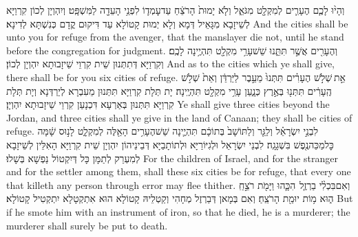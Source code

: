 {וְהָי֨וּ לָכֶ֧ם הֶעָרִ֛ים לְמִקְלָ֖ט מִגֹּאֵ֑ל וְלֹ֤א יָמוּת֙ הָרֹצֵ֔חַ עַד\maqqaf עׇמְד֛וֹ לִפְנֵ֥י הָעֵדָ֖ה לַמִּשְׁפָּֽט׃}
{וְיִהְוְיָן לְכוֹן קִרְוַיָּא לְשֵׁיזָבָא מִגָּאֵיל דְּמָא וְלָא יְמוּת קָטוֹלָא עַד דִּיקוּם קֳדָם כְּנִשְׁתָּא לְדִינָא׃}
{And the cities shall be unto you for refuge from the avenger, that the manslayer die not, until he stand before the congregation for judgment.}{}
{וְהֶעָרִ֖ים אֲשֶׁ֣ר תִּתֵּ֑נוּ שֵׁשׁ\maqqaf עָרֵ֥י מִקְלָ֖ט תִּהְיֶ֥ינָה לָכֶֽם׃}
{וְקִרְוַיָּא דְּתִתְּנוּן שֵׁית קִרְוֵי שֵׁיזָבוּתָא יִהְוְיָן לְכוֹן׃}
{And as to the cities which ye shall give, there shall be for you six cities of refuge.}{}
{אֵ֣ת \legarmeh  שְׁלֹ֣שׁ הֶעָרִ֗ים תִּתְּנוּ֙ מֵעֵ֣בֶר לַיַּרְדֵּ֔ן וְאֵת֙ שְׁלֹ֣שׁ הֶֽעָרִ֔ים תִּתְּנ֖וּ בְּאֶ֣רֶץ כְּנָ֑עַן עָרֵ֥י מִקְלָ֖ט תִּהְיֶֽינָה׃}
{יָת תְּלָת קִרְוַיָּא תִּתְּנוּן מֵעִבְרָא לְיַרְדְּנָא וְיָת תְּלָת קִרְוַיָּא תִּתְּנוּן בְּאַרְעָא דִּכְנָעַן קִרְוֵי שֵׁיזָבוּתָא יִהְוְיָן׃}
{Ye shall give three cities beyond the Jordan, and three cities shall ye give in the land of Canaan; they shall be cities of refuge.}{}
{לִבְנֵ֣י יִשְׂרָאֵ֗ל וְלַגֵּ֤ר וְלַתּוֹשָׁב֙ בְּתוֹכָ֔ם תִּהְיֶ֛ינָה שֵׁשׁ\maqqaf הֶעָרִ֥ים הָאֵ֖לֶּה לְמִקְלָ֑ט לָנ֣וּס שָׁ֔מָּה כׇּל\maqqaf מַכֵּה\maqqaf נֶ֖פֶשׁ בִּשְׁגָגָֽה׃}
{לִבְנֵי יִשְׂרָאֵל וּלְגִיּוֹרַיָּא וּלְתוֹתָבַיָּא דְּבֵינֵיהוֹן יִהְוְיָן שֵׁית קִרְוַיָּא הָאִלֵּין לְשֵׁיזָבָא לְמִעְרַק לְתַמָּן כָּל דְּיִקְטוֹל נַפְשָׁא בְּשָׁלוּ׃}
{For the children of Israel, and for the stranger and for the settler among them, shall these six cities be for refuge, that every one that killeth any person through error may flee thither.}{}
{וְאִם\maqqaf בִּכְלִ֨י בַרְזֶ֧ל \pasek  הִכָּ֛הוּ וַיָּמֹ֖ת רֹצֵ֣חַֽ ה֑וּא מ֥וֹת יוּמַ֖ת הָרֹצֵֽחַ׃}
{וְאִם בְּמָאן דְּבַרְזֶל מְחָהִי וְקַטְלֵיהּ קָטוֹלָא הוּא אִתְקְטָלָא יִתְקְטִיל קָטוֹלָא׃}
{But if he smote him with an instrument of iron, so that he died, he is a murderer; the murderer shall surely be put to death.}{}
